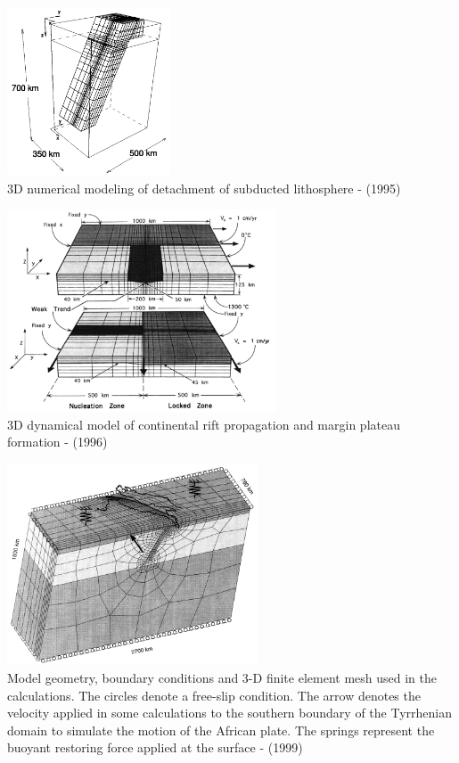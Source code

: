 \begin{center}
\begin{minipage}{0.45\textwidth}
\centering
\includegraphics[height=5cm]{images/history/yowo95}\\
{\captionfont 3D numerical modeling of detachment of subducted 
lithosphere - \textcite{yowo95} (1995)}
\end{minipage}\hfill
\begin{minipage}{0.45\textwidth}
\centering
\includegraphics[height=6cm]{images/history/dusa96}\\
{\captionfont 3D dynamical model of continental rift propagation and 
margin plateau formation - \textcite{dusa96} (1996)}
\end{minipage}
\end{center}



\begin{center}
\includegraphics[height=6cm]{images/history/nesb99}\\
{\captionfont Model geometry, boundary conditions and 3-D finite element mesh used in 
the calculations. The circles denote a free-slip condition. The arrow denotes the velocity 
applied in some calculations to the southern boundary of the Tyrrhenian domain to simulate 
the motion of the African plate. The springs represent the buoyant restoring force applied 
at the surface - \textcite{nesb99} (1999)}
\end{center}

